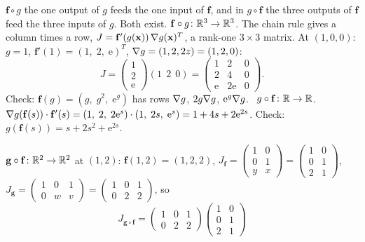\begin{solutions}
        $\mathbf{f}\circ g$ the one output of $g$ feeds the one input of
        $\mathbf{f}$, and in $g\circ\mathbf{f}$ the three outputs of
        $\mathbf{f}$ feed the three inputs of $g$. Both exist.
        \emph{$\mathbf{f}\circ g\colon\mathbb{R}^{3}\to\mathbb{R}^{3}$.} The chain rule
        gives a column times a row,
        $J=\mathbf{f}'(g(\mathbf{x}))\,\nabla g(\mathbf{x})^{T}$, a
        rank-one $3\times3$ matrix. At $(1,0,0)$: $g=1$,
        $\mathbf{f}'(1)=(1,\;2,\;\mathrm{e})^{T}$, $\nabla g=(1,2,2z)=(1,2,0)$:
        \[
          J=\begin{pmatrix}1\\2\\\mathrm{e}\end{pmatrix}(1\ \ 2\ \ 0)
           =\begin{pmatrix}1&2&0\\2&4&0\\\mathrm{e}&2\mathrm{e}&0\end{pmatrix} .
        \]
        Check: $\mathbf{f}(g)=(g,\;g^{2},\;\mathrm{e}^{g})$ has rows
        $\nabla g$, $2g\nabla g$, $\mathrm{e}^{g}\nabla g$. \checkmark\
        \emph{$g\circ\mathbf{f}\colon\mathbb{R}\to\mathbb{R}$.}
        $\nabla g(\mathbf{f}(s))\cdot\mathbf{f}'(s)=(1,\;2,\;2\mathrm{e}^{s})
        \cdot(1,\;2s,\;\mathrm{e}^{s})=1+4s+2\mathrm{e}^{2s}$. Check:
        $g(\mathbf{f}(s))=s+2s^{2}+\mathrm{e}^{2s}$. \checkmark
  \item \emph{$\mathbf{g}\circ\mathbf{f}\colon\mathbb{R}^{2}\to\mathbb{R}^{2}$} at $(1,2)$:
        $\mathbf{f}(1,2)=(1,2,2)$,
        $J_{\mathbf{f}}=\begin{pmatrix}1&0\\0&1\\y&x\end{pmatrix}
        =\begin{pmatrix}1&0\\0&1\\2&1\end{pmatrix}$,
        $J_{\mathbf{g}}=\begin{pmatrix}1&0&1\\0&w&v\end{pmatrix}
        =\begin{pmatrix}1&0&1\\0&2&2\end{pmatrix}$, so
        \[
          J_{\mathbf{g}\circ\mathbf{f}}=\begin{pmatrix}1&0&1\\0&2&2\end{pmatrix}
          \begin{pmatrix}1&0\\0&1\\2&1\end{pmatrix}
\]
\end{solutions}
